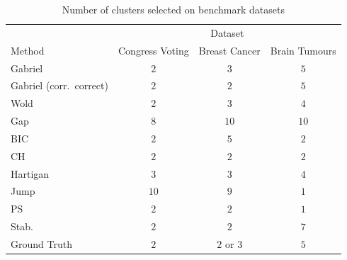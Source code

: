 \documentclass[12pt]{article}
\begin{document}



\begin{table}
\centering
\captionsetup{justification=centering}
\caption{\label{tab:benchmark} Number of clusters selected on benchmark datasets}
\begin{tabular}{lccc}
\toprule                  
         & \multicolumn{3}{c}{Dataset} \\
\cmidrule(l){2-4}
Method   & Congress Voting & Breast Cancer & Brain Tumours \\
\midrule                    
Gabriel  & $2$             & $3$           & $5$  \\    
Gabriel (corr.~correct) & $2$ & $2$           & $5$  \\  
Wold     & $2$             & $3$           & $4$  \\
Gap      & $8$             & $10$          & $10$ \\   
BIC      & $2$         & $5$           & $2$  \\   
CH       & $2$             & $2$           & $2$  \\
Hartigan & $3$             & $3$           & $4$  \\
Jump     & $10$            & $9$           & $1$  \\   
PS       & $2$  & $2$           & $1$  \\
Stab.    & $2$  & $2$           & $7$  \\ 
\midrule 
Ground Truth & $2$         & $2$ or $3$    & $5$  \\
\bottomrule
\end{tabular}
\end{table} 
\end{document}
